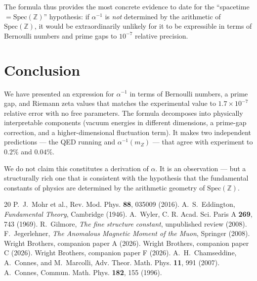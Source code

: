 \documentclass[11pt,a4paper]{article}
\newcommand{\Spec}{\mathrm{Spec}}
\begin{document}
The formula thus provides the most concrete evidence to date
for the ``spacetime $= \Spec(\mathbb{Z})$'' hypothesis:
if $\alpha^{-1}$ is \emph{not} determined by the arithmetic of
$\Spec(\mathbb{Z})$, it would be extraordinarily unlikely for
it to be expressible in terms of Bernoulli numbers and prime
gaps to $10^{-7}$ relative precision.

\section{Conclusion}

We have presented an expression for $\alpha^{-1}$ in terms of
Bernoulli numbers, a prime gap, and Riemann zeta values that
matches the experimental value to $1.7 \times 10^{-7}$ relative
error with no free parameters. The formula decomposes into
physically interpretable components (vacuum energies in different
dimensions, a prime-gap correction, and a higher-dimensional
fluctuation term). It makes two independent predictions ---
the QED running and $\alpha^{-1}(m_Z)$ --- that agree with
experiment to $0.2\%$ and $0.04\%$.

We do not claim this constitutes a derivation of $\alpha$.
It is an observation --- but a structurally rich one that is
consistent with the hypothesis that the fundamental constants
of physics are determined by the arithmetic geometry of
$\Spec(\mathbb{Z})$.

\begin{thebibliography}{20}
 P.~J.~Mohr et al., Rev. Mod. Phys. \textbf{88}, 035009 (2016).
 A.~S.~Eddington, \emph{Fundamental Theory}, Cambridge (1946).
 A.~Wyler, C. R. Acad. Sci. Paris A \textbf{269}, 743 (1969).
 R.~Gilmore, \emph{The fine structure constant}, unpublished review (2008).
 F.~Jegerlehner, \emph{The Anomalous Magnetic Moment of the Muon}, Springer (2008).
 Wright Brothers, companion paper A (2026).
 Wright Brothers, companion paper C (2026).
 Wright Brothers, companion paper F (2026).
 A.~H.~Chamseddine, A.~Connes, and M.~Marcolli, Adv. Theor. Math. Phys. \textbf{11}, 991 (2007).
 A.~Connes, Commun. Math. Phys. \textbf{182}, 155 (1996).
\end{thebibliography}
\end{document}
